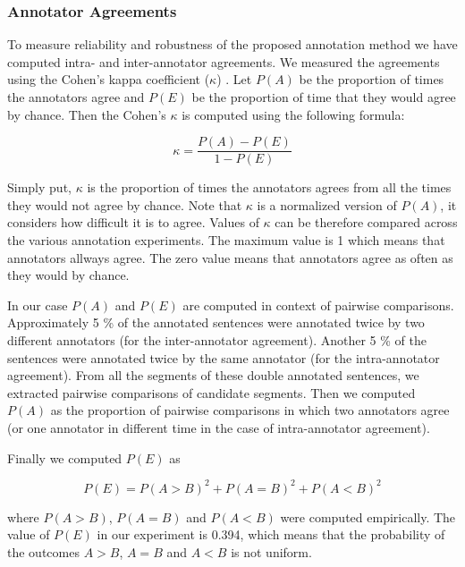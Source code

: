 \subsubsection{Annotator Agreements}

To measure reliability and robustness of the proposed annotation method we have
computed intra- and inter-annotator agreements.   We measured the agreements
using the Cohen's kappa coefficient ($\kappa$) . Let $P(A)$
be the proportion of times the annotators agree and $P(E)$ be the proportion of
time that they would agree by chance. Then the Cohen's $\kappa$ is computed
using the following formula:

\begin{equation*}
    \kappa = \frac{P(A)-P(E)}{1-P(E)}
\end{equation*}

\noindent Simply put, $\kappa$ is the proportion of times the annotators agrees
from all the times they would not agree by chance. Note that $\kappa$ is a
normalized version of $P(A)$, it considers how difficult it is to agree.
Values of $\kappa$ can be therefore compared across the various annotation
experiments. The maximum value is 1 which means that annotators allways agree.
The zero value means that annotators agree as often as they would by chance.

In our case $P(A)$ and $P(E)$ are computed in context of pairwise comparisons.
Approximately 5 \% of the annotated sentences were annotated twice by two
different annotators (for the inter-annotator agreement).  Another 5 \% of the
sentences were annotated twice by the same annotator (for the intra-annotator
agreement). From all the segments of these double annotated sentences, we
extracted pairwise comparisons of candidate segments. Then we computed $P(A)$
as the proportion of pairwise comparisons in which two annotators agree (or one
annotator in different time in the case of intra-annotator agreement). 

Finally we computed $P(E)$ as 

\begin{equation*}
    P(E) = P(A>B)^2 + P(A=B)^2 + P(A<B)^2
\end{equation*}

\noindent where $P(A>B)$, $P(A=B)$ and $P(A<B)$ were computed empirically. The
value of $P(E)$ in our experiment is 0.394, which means that the probability of
the outcomes $A>B$, $A=B$ and $A<B$ is not uniform.

